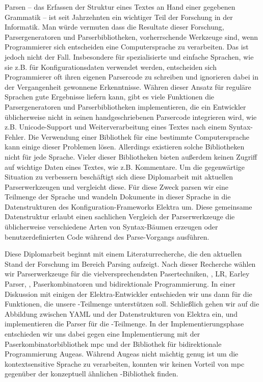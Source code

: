 \begin{kurzfassung}
Parsen – das Erfassen der Struktur eines Textes an Hand einer gegebenen Grammatik – ist seit Jahrzehnten ein wichtiger Teil der Forschung in der Informatik. Man würde vermuten dass die Resultate dieser Forschung, Parsergeneratoren und Parserbibliotheken, vorherrschende Werkzeuge sind, wenn Programmierer sich entscheiden eine Computersprache zu verarbeiten. Das ist jedoch nicht der Fall. Insbesondere für spezialisierte und einfache Sprachen, wie sie z.B. für Konfigurationsdaten verwendet werden, entscheiden sich Programmierer oft ihren eigenen Parsercode zu schreiben und ignorieren dabei in der Vergangenheit gewonnene Erkenntnisse. Währen dieser Ansatz für reguläre Sprachen gute Ergebnisse liefern kann, gibt es viele Funktionen die Parsergeneratoren und Parserbibliotheken implementieren, die ein Entwickler üblicherweise nicht in seinen handgeschriebenen Parsercode integrieren wird, wie z.B. Unicode-Support und Weiterverarbeitung eines Textes nach einem Syntax-Fehler. Die Verwendung einer Bibliothek für eine bestimmte Computersprache kann einige dieser Problemen lösen. Allerdings existieren solche Bibliotheken nicht für jede Sprache. Vieler dieser Bibliotheken bieten außerdem keinen Zugriff auf wichtige Daten eines Textes, wie z.B. Kommentare. Um die gegenwärtige Situation zu verbessern beschäftigt sich diese Diplomarbeit mit aktuellen Parserwerkzeugen und vergleicht diese. Für diese Zweck parsen wir eine Teilmenge der Sprache  und wandeln Dokumente in dieser Sprache in die Datenstrukturen des Konfiguration-Frameworks Elektra um. Diese gemeinsame Datenstruktur erlaubt einen sachlichen Vergleich der Parserwerkzeuge die üblicherweise verschiedene Arten von Syntax-Bäumen erzeugen oder benutzerdefinierten Code während des Parse-Vorgangs ausführen.

Diese Diplomarbeit beginnt mit einem Literaturrecherche, die den aktuellen Stand der Forschung im Bereich Parsing aufzeigt. Nach dieser Recherche wählen wir Parserwerkzeuge für die vielversprechendsten Pasertechniken, , LR, Earley Parser, , Paserkombinatoren und bidirektionale Programmierung. In einer Diskussion mit einigen der Elektra-Entwickler entschieden wir uns dann für die Funktionen, die unsere -Teilmenge unterstützen soll. Schließlich gehen wir auf die Abbildung zwischen YAML und der Datenstrukturen von Elektra ein, und implementieren die Parser für die -Teilmenge. In der Implementierungsphase entschieden wir uns dabei gegen eine Implementierung mit der Paserkombinatorbibliothek mpc und der Bibliothek für bidirektionale Programmierung Augeas. Während Augeas nicht mächtig genug ist um die kontextsensitive Sprache  zu verarbeiten, konnten wir keinen Vorteil von mpc gegenüber der konzeptuell ähnlichen -Bibliothek  finden.


\end{kurzfassung}
